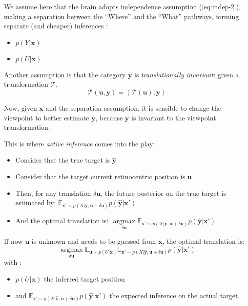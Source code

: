 We assume here that the brain adopts independence assumption (\ref{eq:indep-2}), making a separation between the ``Where'' and the ``What'' pathways, forming separate (and cheaper) inferences :
\begin{itemize}
\item $p(Y|\boldsymbol{x})$
\item $p(U|\boldsymbol{x})$
\end{itemize}

Another assumption is that the category $\boldsymbol{y}$ is \emph{translationally invariant}: given a transformation $\mathcal{T}$,
$$\mathcal{T}(\boldsymbol{u}, \boldsymbol{y})
= (\mathcal{T}(\boldsymbol{u}), \boldsymbol{y})$$

Now, given $\boldsymbol{x}$ and the separation assumption, it is sensible to change the viewpoint to better estimate $\boldsymbol{y}$, because  $\boldsymbol{y}$ is invariant to the viewpoint transformation.

This is where \emph{active inference} comes into the play:
\begin{itemize}
\item Consider that the true target is $\hat{\boldsymbol{y}}$
\item Consider that the target current retinocentric position is $\boldsymbol{u}$
\item Then, for any translation $\delta \boldsymbol{u}$, the future posterior on the true target is estimated by:
$\mathbb{E}_{\boldsymbol{x}'\sim p(X|\hat{\boldsymbol{y}}, \boldsymbol{u}+\delta \boldsymbol{u})} p(\hat{\boldsymbol{y}}|\boldsymbol{x}')$
\item And the optimal translation is:  $\underset{\delta\boldsymbol{u}}{\text{ argmax }}  \mathbb{E}_{\boldsymbol{x}'\sim p(X|\hat{\boldsymbol{y}}, \boldsymbol{u}+\delta \boldsymbol{u})} p(\hat{\boldsymbol{y}}|\boldsymbol{x}')$
\end{itemize}

If now $\boldsymbol{u}$ is unknown and needs to be guessed from $\boldsymbol{x}$, the optimal translation is:
$$\underset{\delta\boldsymbol{u}}{\text{ argmax }} \mathbb{E}_{\boldsymbol{u}\sim p(U|\boldsymbol{x})} \mathbb{E}_{\boldsymbol{x}'\sim p(X|\hat{\boldsymbol{y}}, \boldsymbol{u}+\delta \boldsymbol{u})} p(\hat{\boldsymbol{y}}|\boldsymbol{x}')$$
with :
\begin{itemize}
\item $p(U|\boldsymbol{x})$ the inferred target position
\item and $\mathbb{E}_{\boldsymbol{x}'\sim p(X|\hat{\boldsymbol{y}}, \boldsymbol{u}+\delta \boldsymbol{u})} p(\hat{\boldsymbol{y}}|\boldsymbol{x}')$ the expected inference on the actual target.
\end{itemize}

